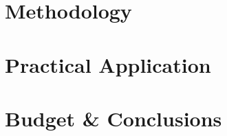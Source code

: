 \documentclass[a4paper,12pt]{book}
\newcommand{\shorttitle}{Seismic Digital Twin}
\newcommand{\headingtextR}{\shorttitle}
\newcommand{\headingtextL}{}
\renewcommand{\$}{\text{ €}}
\begin{document}
\part{Methodology}

\renewcommand{\headingtextL}{}
\renewcommand{\headingtextR}{\shorttitle}

\renewcommand{\headingtextL}{}
\renewcommand{\headingtextR}{\shorttitle}

\renewcommand{\headingtextL}{}
\renewcommand{\headingtextR}{\shorttitle}

\renewcommand{\headingtextL}{}
\renewcommand{\headingtextR}{\shorttitle}

\renewcommand{\headingtextL}{}
\renewcommand{\headingtextR}{\shorttitle}

\renewcommand{\headingtextL}{}
\renewcommand{\headingtextR}{\shorttitle}

\renewcommand{\headingtextL}{}
\renewcommand{\headingtextR}{\shorttitle}

\renewcommand{\headingtextL}{}
\renewcommand{\headingtextR}{\shorttitle}

\part{Practical Application}

\renewcommand{\headingtextL}{}
\renewcommand{\headingtextR}{\shorttitle}

\renewcommand{\headingtextL}{}
\renewcommand{\headingtextR}{\shorttitle}

\renewcommand{\headingtextL}{}
\renewcommand{\headingtextR}{\shorttitle}

\renewcommand{\headingtextL}{}
\renewcommand{\headingtextR}{\shorttitle}

\renewcommand{\headingtextL}{}
\renewcommand{\headingtextR}{\shorttitle}

\renewcommand{\headingtextL}{}
\renewcommand{\headingtextR}{\shorttitle}

\renewcommand{\headingtextL}{}
\renewcommand{\headingtextR}{\shorttitle}

\renewcommand{\headingtextL}{}
\renewcommand{\headingtextR}{\shorttitle}

\part{Budget \& Conclusions}
\renewcommand{\headingtextL}{}
\renewcommand{\headingtextR}{\shorttitle}

\renewcommand{\headingtextL}{}
\renewcommand{\headingtextR}{\shorttitle}

\renewcommand{\headingtextL}{}
\renewcommand{\headingtextR}{\shorttitle}


\end{document}
